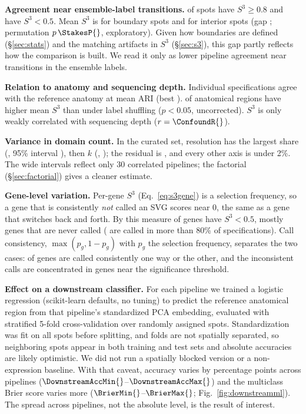 \textbf{Agreement near ensemble-label transitions.} \SpotStableFrac{} of spots
have $S^3\ge0.8$ and \SpotFragileFrac{} have $S^3<0.5$. Mean $S^3$ is
\BoundaryS{} for boundary spots and \InteriorS{} for interior spots (gap
\StakesGap{}; permutation $p\,\StakesP{}$, exploratory). Given how
boundaries are defined (\S\ref{sec:stats}) and the matching artifacts in
$S^3$ (\S\ref{sec:s3}), this gap partly reflects how the comparison is
built. We read it only as lower pipeline agreement near transitions in the
ensemble labels.

\textbf{Relation to anatomy and sequencing depth.} Individual
specifications agree with the reference anatomy at mean ARI \RefAriMean{}
(best \RefAriMax{}). \RegionsStable{} of \NregionsTotal{} anatomical regions
have higher mean $S^3$ than under label shuffling ($p<0.05$, uncorrected).
$S^3$ is only weakly correlated with sequencing depth ($r=\ConfoundR{}$).

\textbf{Variance in domain count.} In the curated set, resolution has the
largest share (\CatHneRes{}, 95\% interval \CatHneResCI{}), then $k$
(\CatHneK{}, \CatHneKCI{}); the residual is \CatHneResid{}, and every
other axis is under 2\%. The wide intervals reflect only 30 correlated
pipelines; the factorial (\S\ref{sec:factorial}) gives a cleaner estimate.

\textbf{Gene-level variation.} Per-gene $S^3$ (Eq.~\ref{eq:s3gene}) is a
selection frequency, so a gene that is consistently \emph{not} called an
SVG scores near 0, the same as a gene that switches back and forth. By this
measure \GeneSelFreqLowFrac{} of genes have $S^3<0.5$, mostly genes that
are never called (\GeneRobustFrac{} are called in more than 80\% of
specifications). Call consistency, $\max(p_g,1-p_g)$ with $p_g$ the
selection frequency, separates the two cases: \GeneConsistentFrac{} of
genes are called consistently one way or the other, and the inconsistent
calls are concentrated in genes near the significance threshold.

\textbf{Effect on a downstream classifier.} For each pipeline we trained a
logistic regression (scikit-learn defaults, no tuning) to predict the
reference anatomical region from that pipeline's standardized PCA
embedding, evaluated with stratified 5-fold cross-validation over randomly
assigned spots. Standardization was fit on all spots before splitting, and
folds are not spatially separated, so neighboring spots appear in both
training and test sets and absolute accuracies are likely optimistic. We
did not run a spatially blocked version or a non-expression baseline. With
that caveat, accuracy varies by \DownstreamRangePP{} percentage points
across pipelines ($\DownstreamAccMin{}$--$\DownstreamAccMax{}$) and the
multiclass Brier score varies more ($\BrierMin{}$--$\BrierMax{}$;
Fig.~\ref{fig:downstreamml}). The spread across pipelines, not the
absolute level, is the result of interest.

